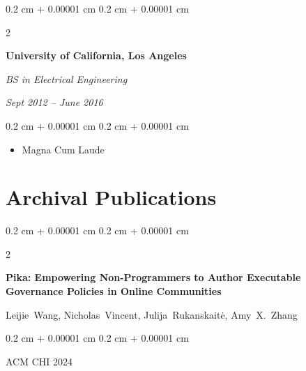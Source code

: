 \documentclass[10pt, letterpaper]{article}
\newenvironment{highlights}{
    \begin{itemize}[
        topsep=0.10 cm,
        parsep=0.10 cm,
        partopsep=0pt,
        itemsep=0pt,
        leftmargin=0.4 cm + 10pt
    ]
}{
    \end{itemize}
} %
\newenvironment{onecolentry}{
    \begin{adjustwidth}{
        0.2 cm + 0.00001 cm
    }{
        0.2 cm + 0.00001 cm
    }
}{
    \end{adjustwidth}
} %
\newenvironment{twocolentry}[2][]{
    \onecolentry
    \def\secondColumn{#2}
    \setcolumnwidth{\fill, 4.1 cm}
    \begin{paracol}{2}
}{
    \switchcolumn \raggedleft \secondColumn
    \end{paracol}
    \endonecolentry
} %
\begin{document}
        \vspace{0.2 cm}

        \begin{twocolentry}{
            
            
        \textit{Sept 2012 – June 2016}}
            \textbf{University of California, Los Angeles}

            \textit{BS in Electrical Engineering}
        \end{twocolentry}

        \vspace{0.10 cm}
        \begin{onecolentry}
            \begin{highlights}
                \item Magna Cum Laude
            \end{highlights}
        \end{onecolentry}



    
    \section{Archival Publications}



        
        \begin{samepage}
            \begin{twocolentry}{
                2024
            }
                \textbf{Pika: Empowering Non-Programmers to Author Executable Governance Policies in Online Communities}

                \vspace{0.10 cm}

                \mbox{Leijie Wang}, \mbox{Nicholas Vincent}, \mbox{Julija Rukanskaitė}, \mbox{Amy X. Zhang}
            \end{twocolentry}


            \vspace{0.10 cm}

            \begin{onecolentry}
        ACM CHI 2024    \end{onecolentry}
        \end{samepage}

        \vspace{0.2 cm}
\end{document}
